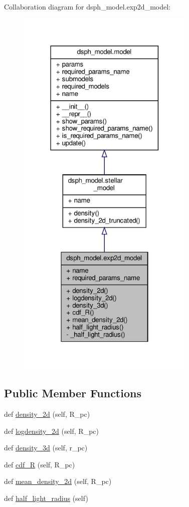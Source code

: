 Collaboration diagram for dsph\+\_\+model.\+exp2d\+\_\+model\+:\nopagebreak
\begin{figure}[H]
\begin{center}
\leavevmode
\includegraphics[width=241pt]{db/d2e/classdsph__model_1_1exp2d__model__coll__graph}
\end{center}
\end{figure}
\subsection*{Public Member Functions}
\begin{DoxyCompactItemize}
\item 
def \hyperlink{classdsph__model_1_1exp2d__model_a41d0f3f53b8a31f9b64c71c733e7718e}{density\+\_\+2d} (self, R\+\_\+pc)
\item 
def \hyperlink{classdsph__model_1_1exp2d__model_a1652d2c72ea1f7da120a2334985a0386}{logdensity\+\_\+2d} (self, R\+\_\+pc)
\item 
def \hyperlink{classdsph__model_1_1exp2d__model_a6736a23153473de1a3cba39c569f0aab}{density\+\_\+3d} (self, r\+\_\+pc)
\item 
def \hyperlink{classdsph__model_1_1exp2d__model_a3a8c90e796e589216687bbe3cf4e42c5}{cdf\+\_\+R} (self, R\+\_\+pc)
\item 
def \hyperlink{classdsph__model_1_1exp2d__model_af2224092e988940539b872a4fe0afa38}{mean\+\_\+density\+\_\+2d} (self, R\+\_\+pc)
\item 
def \hyperlink{classdsph__model_1_1exp2d__model_a477eaae9bad0731911aabdad810c06ee}{half\+\_\+light\+\_\+radius} (self)
\end{DoxyCompactItemize}
